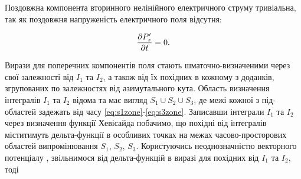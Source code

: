 %

Поздовжна компонента вторинного нелінійного електричного струму тривіальна, так як поздовжня напруженість електричного поля 
відсутня:

\begin{equation*} \begin{aligned}
\frac{\partial P_z^\prime}{\partial t} = 0.
\end{aligned} \end{equation*}

Вирази для поперечних компонентів поля стають шматочно-визначеними
через свої залежності від $ I_1 $ та $ I_2 $, а також від їх похідних в 
кожному з доданків, згрупованих по залежностях від азимутального кута.
Область визначення інтегралів $ I_1 $ та $ I_2 $ відома та має вигляд 
$ S_1 \cup S_2 \cup S_3 $, де межі кожної з під-областей задежать від часу 
\eqref{eq:s1zone}-\eqref{eq:s3zone}. Записавши інтеграли $ I_1 $ та $ I_2 $ 
через визначення функції Хевісайда побачимо, що похідні від інтегралів 
міститимуть дельта-функції в особливих точках на межах часово-просторових 
областей випромінювання $ S_1 $, $ S_2 $, $ S_3 $. Користуючись неоднозначністю 
векторного потенціалу \cite[ст. 77]{imp:LandauII}, звільнимося від дельта-функцій 
в виразі для похідних від $ I_1 $ та $ I_2 $, тоді

